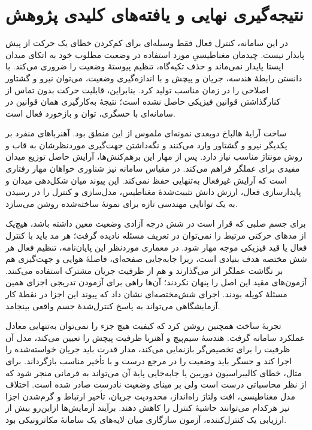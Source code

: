 \section{نتیجه‌گیری نهایی و یافته‌های کلیدی پژوهش}

در این سامانه، کنترل فعال فقط وسیله‌ای برای کم‌کردن خطای یک حرکت از پیش پایدار نیست. چیدمان مغناطیسیِ مورد استفاده در وضعیت مطلوب خود به اتکای میدان ایستا پایدار نمی‌ماند و حذف تکیه‌گاه، تنظیم پیوستهٔ وضعیت را ضروری می‌کند. با دانستن رابطهٔ هندسه، جریان و پیچش و با اندازه‌گیری وضعیت، می‌توان نیرو و گشتاور اصلاحی را در زمان مناسب تولید کرد. بنابراین، قابلیت حرکت بدون تماس از کنارگذاشتن قوانین فیزیکی حاصل نشده است؛ نتیجهٔ به‌کارگیری همان قوانین در سامانه‌ای با حسگری، توان و بازخورد فعال است.

ساخت آرایهٔ هالباخ دوبعدی نمونه‌ای ملموس از این منطق بود. آهنرباهای منفرد بر یکدیگر نیرو و گشتاور وارد می‌کنند و نگه‌داشتن جهت‌گیری موردنظرشان به قاب و روش مونتاژ مناسب نیاز دارد. پس از مهار این برهم‌کنش‌ها، آرایش حاصل توزیع میدان مفیدی برای عملگر فراهم می‌کند. در مقیاس سامانه نیز شناوری خواهان مهار رفتاری است که آرایش غیرفعال به‌تنهایی حفظ نمی‌کند. این پیوند میان شکل‌دهی میدان و پایدارسازی فعال، ارزش دانش تثبیت‌شدهٔ مغناطیس، مدل‌سازی و کنترل را در رسیدن به یک توانایی مهندسی تازه برای نمونهٔ ساخته‌شده روشن می‌سازد.

برای جسم صلبی که قرار است در شش درجه آزادی وضعیت معین داشته باشد، هیچ‌یک از مدهای حرکتی مرتبط را نمی‌توان در تعریف مسئله نادیده گرفت؛ هر مد باید با کنترل فعال یا قید فیزیکی موجه مهار شود. در معماری موردنظر این پایان‌نامه، تنظیم فعال هر شش مختصه هدف بنیادی است، زیرا جابه‌جایی صفحه‌ای، فاصلهٔ هوایی و جهت‌گیری هم بر نگاشت عملگر اثر می‌گذارند و هم از ظرفیت جریان مشترک استفاده می‌کنند. آزمون‌های مقید این اصل را پنهان نکردند؛ آن‌ها راهی برای آزمودن تدریجی اجزای همین مسئلهٔ کوپله بودند. اجرای شش‌مختصه‌ای نشان داد که پیوند این اجزا در نقطهٔ کار آزمایشگاهی می‌تواند به پاسخ کنترل‌شدهٔ جسم واقعی بینجامد.

تجربهٔ ساخت همچنین روشن کرد که کیفیت هیچ جزء را نمی‌توان به‌تنهایی معادل عملکرد سامانه گرفت. هندسهٔ سیم‌پیچ و آهنربا ظرفیت پیچش را تعیین می‌کند، مدل آن ظرفیت را برای تخصیص‌گر بازنمایی می‌کند، مدار قدرت باید جریان خواسته‌شده را اجرا کند و حسگر باید وضعیت را در مرجع درست و با تأخیر مناسب بازگرداند. برای مثال، خطای کالیبراسیون دوربین یا جابه‌جایی پایهٔ آن می‌تواند به فرمانی منجر شود که از نظر محاسباتی درست است ولی بر مبنای وضعیت نادرست صادر شده است. اختلاف مدل مغناطیسی، افت ولتاژ راه‌انداز، محدودیت جریان، تأخیر ارتباط و گرم‌شدن اجزا نیز هرکدام می‌توانند حاشیهٔ کنترل را کاهش دهند. برآیند آزمایش‌ها ازاین‌رو بیش از ارزیابی یک کنترل‌کننده، آزمون سازگاری میان لایه‌های یک سامانهٔ مکاترونیکی بود.

